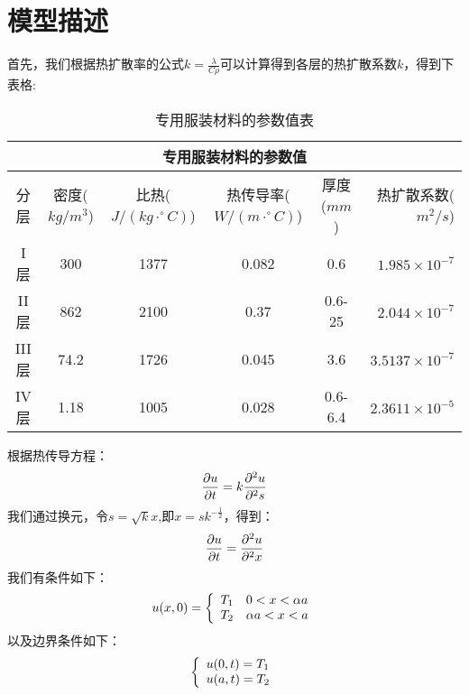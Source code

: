 \documentclass[bwprint]{cumcmthesis}
\begin{document}
\section{模型描述}
    \indent 首先，我们根据热扩散率的公式$k=\frac{\lambda}{C\rho}$可以计算得到各层的热扩散系数$k$，得到下表格:\\
\begin{table}[htbp]
    \centering
      \begin{tabular}{|c|c|c|c|c|r|}
      \hline
      \multicolumn{6}{|c|}{专用服装材料的参数值} \bigstrut\\
      \hline
      分层   & \multicolumn{1}{p{5em}|}{密度\newline{}($kg/m^{3}$)} & \multicolumn{1}{p{5em}|}{比热\newline{}($J/(kg\cdot^{\circ}C)$)} & \multicolumn{1}{p{5em}|}{热传导率\newline{}($W/(m\cdot^{\circ}C)$)} & \multicolumn{1}{p{5em}|}{厚度\newline{}($mm$)} & \multicolumn{1}{p{5em}|}{热扩散系数($m^{2}/s$)} \bigstrut\\
      \hline
      I层    & 300   & 1377  & 0.082 & 0.6   & $1.985\times10^{-7}$ \bigstrut\\
      \hline
      II层   & 862   & 2100  & 0.37  & 0.6-25 & $2.044\times10^{-7}$ \bigstrut\\
      \hline
      III层  & 74.2  & 1726  & 0.045 & 3.6   & $3.5137\times10^{-7}$ \bigstrut\\
      \hline
      IV层   & 1.18  & 1005  & 0.028 & 0.6-6.4 & $2.3611\times10^{-5}$ \bigstrut\\
      \hline
      \end{tabular}%
      \caption{专用服装材料的参数值表}
    \label{tab:addlabel}%
  \end{table}%

  \indent 根据热传导方程：
  \begin{equation}
      \centering
      \frac{\partial u}{\partial t}=k\frac{\partial^{2}u}{\partial^{2}s}
  \end{equation}
  \indent 我们通过换元，令$s=\sqrt{k}x$,即$x=sk^{-\frac{1}{2}}$，得到：
  \begin{equation}
      \centering
      \frac{\partial u}{\partial t}=\frac{\partial^{2}u}{\partial^{2}x}
  \end{equation}
  \indent 我们有条件如下：
  \begin{equation}  
    \centering
    u(x,0)=\left\{  
     \begin{array}{lr}  
        T_{1}\quad0<x<\alpha a \\   
        T_{2}\quad\alpha a<x<a 
     \end{array}  
    \right.
\end{equation} 
    \indent 以及边界条件如下：
    \begin{equation}
        \centering
        \left\{  
     \begin{array}{lr}  
        u(0,t)=T_{1} \\   
        u(a,t)=T_{2}
     \end{array}  
    \right.
    \end{equation}
  
\end{document}

